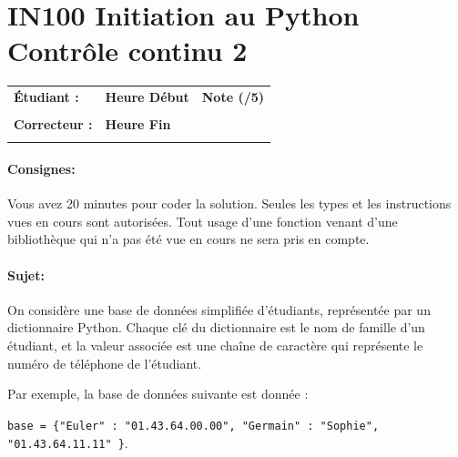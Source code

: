 \documentclass[a4paper,11pt]{article}
\begin{document}
\newpage



\newpage

\section*{\center IN100 Initiation au Python\\
Contrôle continu 2}

\vspace{0.3 cm}

\begin{table}[h!]
\centering
\renewcommand{\arraystretch}{1.4} %
\begin{tabular}{|p{10cm}|p{3cm}|p{2cm}|}
\hline
\textbf{Étudiant :} & \textbf{Heure Début }  & \textbf{Note (/5) }  \\
& & \\
\hline
\textbf{Correcteur :} & \textbf{Heure Fin } & \\
& & \\
\hline

\hline
\end{tabular}
\end{table}
\vspace{0.4 cm}
\paragraph*{Consignes:} Vous avez 20 minutes pour coder la solution. Seules les types et les instructions vues en cours sont autorisées. Tout usage d'une fonction 
venant d'une bibliothèque qui n'a pas été vue en cours ne sera pris en compte. 


\paragraph*{Sujet:}


On considère une base de données simplifiée d’étudiants, représentée par un dictionnaire Python.  
Chaque clé du dictionnaire est le nom de famille d’un étudiant, et la valeur associée est une chaîne de caractère qui représente le  numéro de téléphone de l’étudiant.

Par exemple, la base de données suivante est donnée :

\begin{center}
\texttt{base = \{"Euler" :  "01.43.64.00.00", "Germain" : "Sophie", "01.43.64.11.11" \}}.
\end{center}
\end{document}
